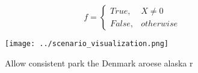\documentclass[a4paper]{article}
\begin{document}
\begin{equation}   f =
\begin{cases} True, & X \neq 0\\
False, & otherwise
\end{cases}
\end{equation}

\begin{figure}
\centering
\texttt{[image: ../scenario\_visualization.png]}
\caption{Allow consistent park the Denmark aroese alaska r
}
\end{figure}
 
\end{document}
